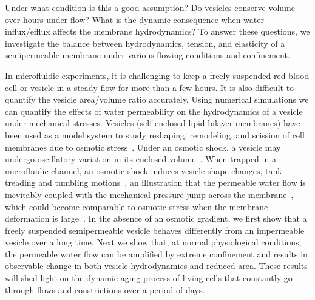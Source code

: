 \documentclass[9pt,twocolumn,twoside,lineno]{pnas-new}
\begin{document}
Under what condition is this a good assumption? Do vesicles conserve
volume over hours under flow? What is the dynamic consequence when water
influx/efflux affects the membrane hydrodynamics? To answer these
questions, we investigate the balance between hydrodynamics, tension,
and elasticity of a semipermeable membrane under various flowing
conditions and confinement. 



In microfluidic experiments, it is challenging to keep a freely
suspended red blood cell or vesicle in a steady flow for more than a few hours. It
is also difficult to quantify the vesicle area/volume ratio accurately.
Using numerical simulations we can quantify the effects of water
permeability on the hydrodynamics of a vesicle under mechanical
stresses. Vesicles (self-enclosed lipid bilayer membranes) have been
used as a model system to study reshaping, remodeling, and scission of
cell membranes due to osmotic stress~\cite{OgleckaEtAl2014_eLife,
CamposSaric2020_bioRxiv, Dimova2020_GVB, BhatiaChrist2020_SoftMatt}.
Under an osmotic shock, a vesicle may undergo oscillatory variation in
its enclosed volume~\cite{ChabanonHoLiedberg2017_BJ}. When trapped in a
microfluidic channel, an osmotic shock induces vesicle shape changes,
tank-treading and tumbling
motions~\cite{BhatiaRobinsonDimova2020_SoftMatt,
BhatiaChrist2020_SoftMatt}, an illustration that the permeable water
flow is inevitably coupled with the mechanical pressure jump across the
membrane~\cite{yao-mor2017}, which could become comparable to osmotic
stress when the membrane deformation is large~\cite{LiMoriSun2015_PRL,
yao-mor2017}. In the absence of an osmotic gradient, we first show that
a freely suspended semipermeable vesicle behaves differently from an
impermeable vesicle over a long time. Next we show that, at normal
physiological conditions, the permeable water flow can be amplified by
extreme confinement and results in observable change in both vesicle
hydrodynamics and reduced area. These results will shed light on the
dynamic aging process of living cells that constantly go through flows
and constrictions over a period of days.
 
\end{document}
